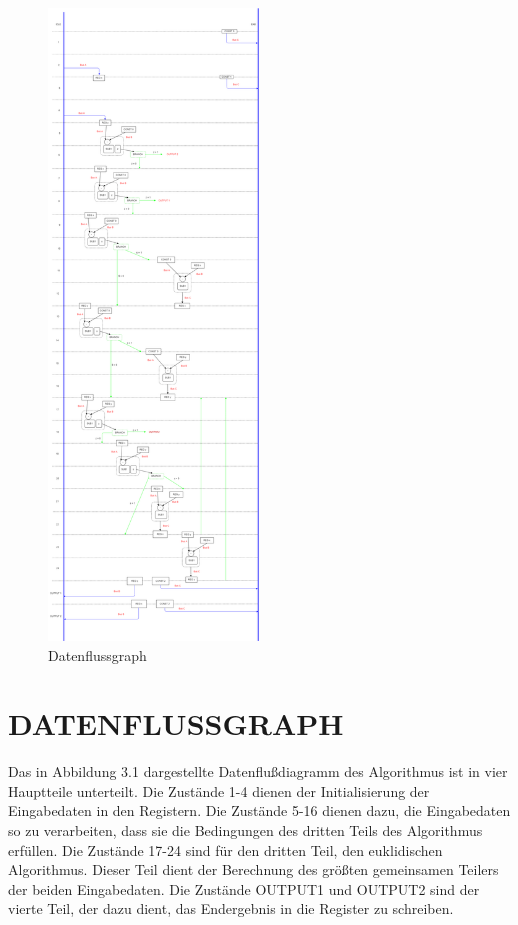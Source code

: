 \begin{figure}[H]
  \centering
  \includegraphics[width=0.5\textwidth]{images/Datenflussgraph.png}
  \caption[Datenflussgraph]{Datenflussgraph}
  \label{fig:datenflussgraph}
\end{figure}

\section{DATENFLUSSGRAPH}
Das in Abbildung 3.1 dargestellte Datenflußdiagramm des Algorithmus ist in vier Hauptteile unterteilt. Die Zustände 1-4 dienen der Initialisierung der Eingabedaten in den Registern. Die Zustände 5-16 dienen dazu, die Eingabedaten so zu verarbeiten, dass sie die Bedingungen des dritten Teils des Algorithmus erfüllen. Die Zustände 17-24 sind für den dritten Teil, den euklidischen Algorithmus. Dieser Teil dient der Berechnung des größten gemeinsamen Teilers der beiden Eingabedaten. Die Zustände OUTPUT1 und OUTPUT2 sind der vierte Teil, der dazu dient, das Endergebnis in die Register zu schreiben.

